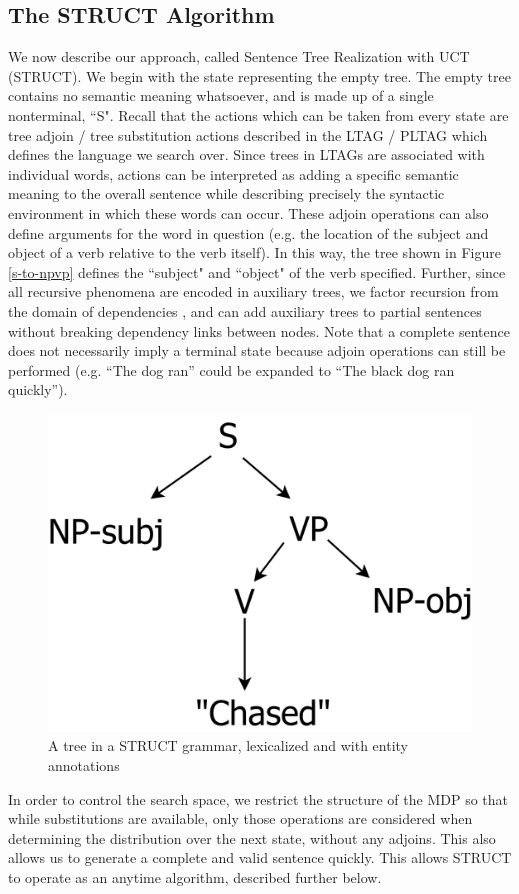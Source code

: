\subsection{The STRUCT Algorithm}
We now describe our approach, called Sentence Tree Realization with
UCT (STRUCT).
We begin with the state representing the empty tree.  The empty tree
contains no semantic meaning whatsoever, and is made up of a single
nonterminal, ``S".  Recall that the actions which can be taken from
every state are tree adjoin / tree substitution actions described in the
LTAG / PLTAG which defines the language we search over.
Since trees in LTAGs are associated
with individual words, actions can be interpreted as adding a specific
semantic meaning to the overall sentence while describing precisely
the syntactic environment in which these words can occur.
These adjoin operations can also
define arguments for the word in question (e.g. the
location of the subject and object of a verb relative to the verb itself).
In this way, the tree shown in Figure \ref{s-to-npvp} defines the
``subject" and ``object" of the verb specified.
Further, since all recursive phenomena are
encoded in auxiliary trees, we factor recursion from the domain of
dependencies \cite{bauer2009statistical}, and can add auxiliary trees
to partial sentences without breaking dependency links between nodes.
Note that a complete sentence does not necessarily imply
a terminal state because adjoin operations can still be performed
(e.g. ``The dog ran'' could be expanded to ``The black dog ran quickly'').

\begin{figure}
\centering
\includegraphics[width=.4\linewidth]{s-vpnp.png}
\caption{A tree in a STRUCT grammar, lexicalized and with entity annotations}
\label{s-to-vpnp}
\end{figure}

In order to control the search space, we restrict the structure of the
MDP so that while substitutions are available, only those operations
are considered when determining the distribution over the next state,
without any adjoins.  This also allows us to generate a
complete and valid sentence quickly.  This allows STRUCT to operate as
an anytime algorithm, described further below.

